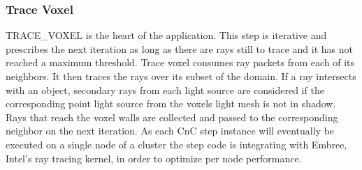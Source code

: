 \documentclass{vgtc}                          %
\begin{document}
\subsubsection{Trace Voxel}

TRACE\_VOXEL is the heart of the application.  This step is iterative and prescribes the next iteration as long as there are rays still to trace and it has not reached a maximum threshold.  Trace voxel consumes ray packets from each of its neighbors.  It then traces the rays over its subset of the domain.  If a ray intersects with an object, secondary rays from each light source are considered if the corresponding point light source from the voxels light mesh is not in shadow.  Rays that reach the voxel walls are collected and passed to the corresponding neighbor on the next iteration.  As each CnC step instance will eventually be executed on a single node of a cluster the step code is integrating with Embree, Intel’s ray tracing kernel, in order to optimize per node performance.
\end{document}
